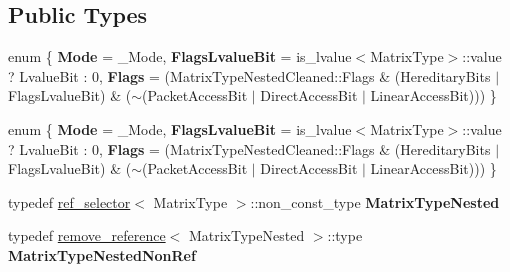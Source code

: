 \subsection*{Public Types}
\begin{DoxyCompactItemize}
\item 
\mbox{\label{struct_eigen_1_1internal_1_1traits_3_01_triangular_view_3_01_matrix_type_00_01___mode_01_4_01_4_ae99aef73bb220eb44de0a5b9ff716064}} 
enum \{ {\bfseries Mode} = \+\_\+\+Mode, 
{\bfseries Flags\+Lvalue\+Bit} = is\+\_\+lvalue$<$Matrix\+Type$>$\+:\+:value ? Lvalue\+Bit \+: 0, 
{\bfseries Flags} = (Matrix\+Type\+Nested\+Cleaned\+:\+:Flags \& (Hereditary\+Bits $\vert$ Flags\+Lvalue\+Bit) \& ($\sim$(Packet\+Access\+Bit $\vert$ Direct\+Access\+Bit $\vert$ Linear\+Access\+Bit)))
 \}
\item 
\mbox{\label{struct_eigen_1_1internal_1_1traits_3_01_triangular_view_3_01_matrix_type_00_01___mode_01_4_01_4_abb5580be5c379d1794cec8bc3edb1cf6}} 
enum \{ {\bfseries Mode} = \+\_\+\+Mode, 
{\bfseries Flags\+Lvalue\+Bit} = is\+\_\+lvalue$<$Matrix\+Type$>$\+:\+:value ? Lvalue\+Bit \+: 0, 
{\bfseries Flags} = (Matrix\+Type\+Nested\+Cleaned\+:\+:Flags \& (Hereditary\+Bits $\vert$ Flags\+Lvalue\+Bit) \& ($\sim$(Packet\+Access\+Bit $\vert$ Direct\+Access\+Bit $\vert$ Linear\+Access\+Bit)))
 \}
\item 
\mbox{\label{struct_eigen_1_1internal_1_1traits_3_01_triangular_view_3_01_matrix_type_00_01___mode_01_4_01_4_a0c27455b30110fdb375cc5711476561d}} 
typedef \hyperlink{struct_eigen_1_1internal_1_1ref__selector}{ref\+\_\+selector}$<$ Matrix\+Type $>$\+::non\+\_\+const\+\_\+type {\bfseries Matrix\+Type\+Nested}
\item 
\mbox{\label{struct_eigen_1_1internal_1_1traits_3_01_triangular_view_3_01_matrix_type_00_01___mode_01_4_01_4_aaf52a4904b35eabbf5a273ed7f6c2f8d}} 
typedef \hyperlink{struct_eigen_1_1internal_1_1remove__reference}{remove\+\_\+reference}$<$ Matrix\+Type\+Nested $>$\+::type {\bfseries Matrix\+Type\+Nested\+Non\+Ref}

\end{DoxyCompactItemize}
